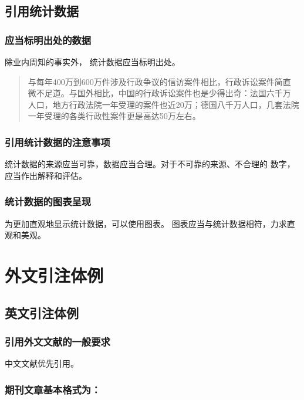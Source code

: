 \documentclass{article}
\begin{document}
\subsection{引用统计数据}


\subsubsection{应当标明出处的数据}

除业内周知的事实外， 统计数据应当标明出处。

\begin{quotation}
与每年400万到600万件涉及行政争议的信访案件相比，行政诉讼案件简直
微不足道。与国外相比，中国的行政诉讼案件也是少得出奇：法国六千万
人口，地方行政法院一年受理的案件也近20万；德国八千万人口，几套法院
一年受理的各类行政性案件更是高达50万左右。
\end{quotation}

\subsubsection{引用统计数据的注意事项}
统计数据的来源应当可靠，数据应当合理。对于不可靠的来源、不合理的
数字，应当作出解释和评估。

\subsubsection{统计数据的图表呈现}
为更加直观地显示统计数据，可以使用图表。
图表应当与统计数据相符，力求直观和美观。


\section{外文引注体例}

\subsection{英文引注体例}\label{sec:fmt:engrefs}


\subsubsection{引用外文文献的一般要求}
中文文献优先引用。


\subsubsection{期刊文章基本格式为：}
\end{document}
